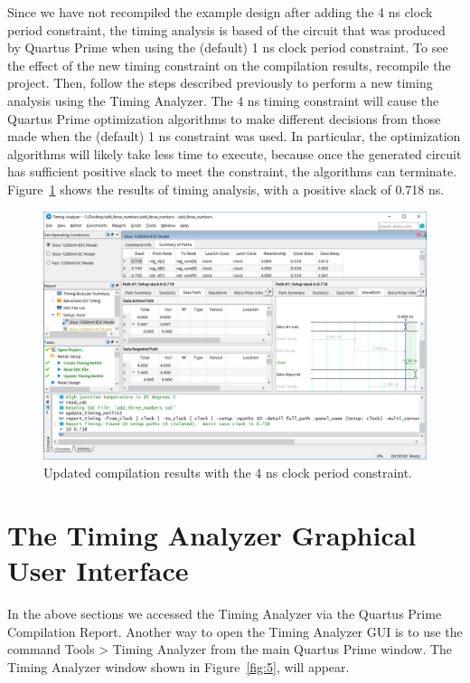 \documentclass[11pt, twoside, pdftex]{article}
\begin{document}
Since we have not recompiled the example design after adding the 4 ns clock period
constraint, the timing analysis is based of the circuit that was produced by Quartus Prime
when using the (default) 1 ns clock period constraint. To see the effect of the new timing
constraint on the compilation results, recompile the project. Then, follow the steps described
previously to perform a new timing analysis using the Timing Analyzer. The 4 ns timing constraint
will cause the Quartus Prime optimization algorithms to make different decisions from those
made when the (default) 1 ns constraint was used. In particular, the optimization
algorithms will likely take less time to execute, because once the generated circuit has
sufficient positive slack to meet the constraint, the algorithms can terminate. 
Figure~\ref{fig:SB9} shows the results of timing analysis, with a positive slack of 0.718 ns. 

\begin{figure}[H]
\begin{center}
\includegraphics[scale=0.5]{figures/SB9.png}
\end{center}
\caption{Updated compilation results with the 4 ns clock period constraint.}
\label{fig:SB9}
\end{figure}

\section{The Timing Analyzer Graphical User Interface}
\label{sec:TQGUI}

In the above sections we accessed the Timing Analyzer via the Quartus Prime Compilation Report. Another
way to open the Timing Analyzer GUI is to use the command {\sf Tools > Timing Analyzer}
from the main Quartus Prime window. The Timing Analyzer window shown in Figure~\ref{fig:5}, will appear.
\end{document}

